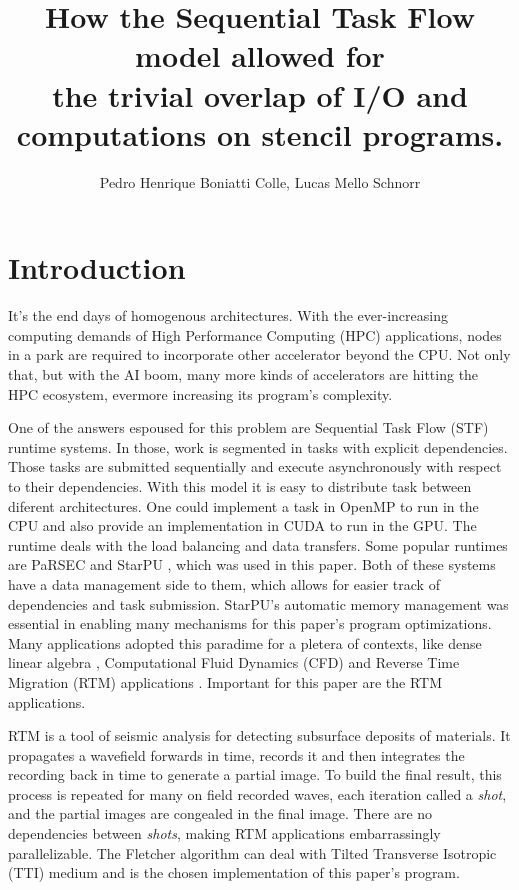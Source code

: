 \documentclass[12pt]{article}
\title{How the Sequential Task Flow model allowed for \\ the trivial overlap of I/O and computations on stencil programs.}
\author{Pedro Henrique Boniatti Colle\inst{1}, Lucas Mello Schnorr\inst{1}}
\newcommand{\intodo}[1]{\todo[inline]{#1}}
\begin{document}
 

\maketitle

\begin{abstract}
	\intodo{Fazer o abstract, mas só no fim.}
\end{abstract}

\section{Introduction}
\label{sec:introduction}
	It's the end days of homogenous architectures. With the ever-increasing computing demands of High Performance Computing (HPC) applications, nodes in a park are required to incorporate other accelerator beyond the CPU. Not only that, but with the AI boom, many more kinds of accelerators are hitting the HPC ecosystem, evermore increasing its program's complexity.

	One of the answers espoused for this problem are Sequential Task Flow (STF) runtime systems. In those, work is segmented in tasks with explicit dependencies. Those tasks are submitted sequentially and execute asynchronously with respect to their dependencies. With this model it is easy to distribute task between diferent architectures. One could implement a task in OpenMP to run in the CPU and also provide an implementation in CUDA to run in the GPU. The runtime deals with the load balancing and data transfers. Some popular runtimes are PaRSEC \cite{bosilca_parsec_2013} and StarPU \cite{starpu-paper}, which was used in this paper. 
	Both of these systems have a data management side to them, which allows for easier track of dependencies and task submission. StarPU's automatic memory management was essential in enabling many mechanisms for this paper's program optimizations. Many applications adopted this paradime for a pletera of contexts, like dense linear algebra \cite{agullo_achieving_2017, abdulah_accelerating_2022}, Computational Fluid Dynamics (CFD) \cite{couteyen_carpaye_design_2018,leandro_nesi_task-based_2020} and Reverse Time Migration (RTM) applications \cite{boillot_task-based_2014, alonazi_asynchronous_2019}. Important for this paper are the RTM applications.

	RTM is a tool of seismic analysis for detecting subsurface deposits of materials. It propagates a wavefield forwards in time, records it and then integrates the recording back in time to generate a partial image. To build the final result, this process is repeated for many on field recorded waves, each iteration called a \textit{shot}, and the partial images are congealed in the final image. There are no dependencies between \textit{shots}, making RTM applications embarrassingly parallelizable. The Fletcher algorithm \cite{fletcher_reverse_2009} can deal with Tilted Transverse Isotropic (TTI) medium and is the chosen implementation of this paper's program.
\end{document}
